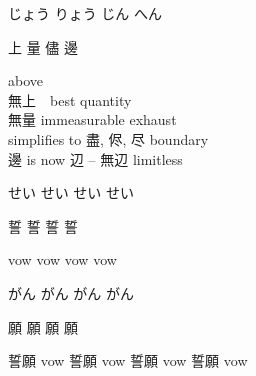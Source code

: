 \documentclass[letterpaper]{article}
\newcommand{\kanji}{\tcbitem\centering\fontsize{55}{55}}
\newcommand{\reading}{\tcbitem\centering\fontsize{10}{10}}
\newcommand{\means}{\tcbitem\centering\fontsize{8}{8}}
\begin{document}
\vspace*{3mm}

\begin{tcbitemize}
	\reading じょう 
	\reading りょう 
	\reading じん 
	\reading へん 
\end{tcbitemize}

\begin{tcbitemize}[coltext=lightgray]
	\kanji 上
	\kanji 量
	\kanji 儘
	\kanji 邊
\end{tcbitemize}

\begin{tcbitemize}
	\means above \\ 無上　best
	\means quantity \\ 無量 immeasurable
	\means exhaust \\ simplifies to 盡,  侭,  尽 
	\means boundary \\ 邊 is now 辺 -- 無辺 limitless 
\end{tcbitemize}


\vspace*{3mm}

\begin{tcbitemize}
	\reading せい 
	\reading せい 
	\reading せい 
	\reading せい 
\end{tcbitemize}


\begin{tcbitemize}[coltext=lightgray]
	\kanji 誓
	\kanji 誓
	\kanji 誓
	\kanji 誓
\end{tcbitemize}

\begin{tcbitemize}
	\means vow
	\means vow
	\means vow 
	\means vow 
\end{tcbitemize}


\vspace*{3mm}

\begin{tcbitemize}
	\reading がん 
	\reading がん 
	\reading がん
	\reading がん 
\end{tcbitemize}

\begin{tcbitemize}[coltext=lightgray]
	\kanji 願
	\kanji 願
	\kanji 願
	\kanji 願
\end{tcbitemize}

\begin{tcbitemize}
	\means 誓願 vow
	\means 誓願 vow
	\means 誓願 vow
	\means 誓願 vow 
\end{tcbitemize}


\vspace*{3mm}
\end{document}
